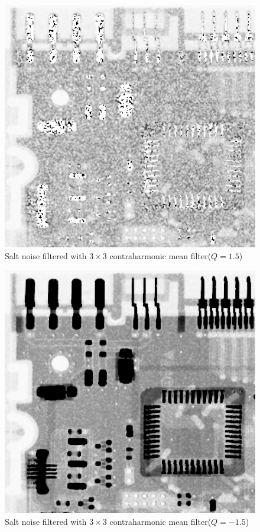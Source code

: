 \documentclass{article}
\begin{document}
\begin{figure}[H]
	\centering
	\includegraphics[width=336pt]{../result/task2/salt/salt-contraharmonic-1-5.png}
	\caption{Salt noise filtered with $3 \times 3$ contraharmonic mean filter($Q = 1.5$)}
	\label{fig:saltchmpos}
\end{figure}

\begin{figure}[H]
	\centering
	\includegraphics[width=336pt]{../result/task2/salt/salt-contraharmonic--1-5.png}
	\caption{Salt noise filtered with $3 \times 3$ contraharmonic mean filter($Q = -1.5$)}
	\label{fig:saltchmneg}
\end{figure}
\end{document}
